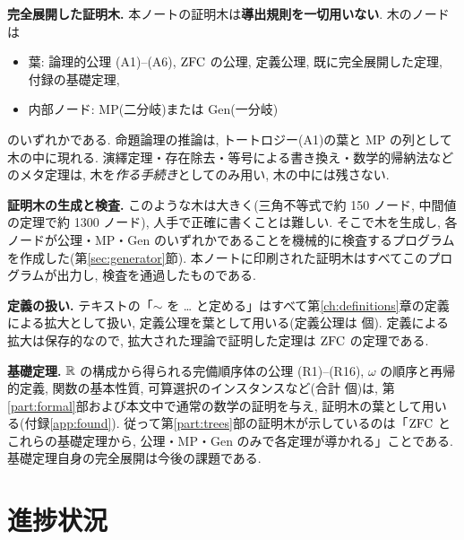 \medskip\noindent\textbf{完全展開した証明木.}\quad
本ノートの証明木は\textbf{導出規則を一切用いない}. 木のノードは
\begin{itemize}
  \item 葉: 論理的公理 (A1)--(A6), $\mathrm{ZFC}$ の公理, 定義公理, 既に完全展開した定理, 付録の基礎定理,
  \item 内部ノード: MP(二分岐)または Gen(一分岐)
\end{itemize}
のいずれかである. 命題論理の推論は, トートロジー(A1)の葉と MP の列として木の中に現れる. 演繹定理・存在除去・等号による書き換え・数学的帰納法などのメタ定理は, 木を\emph{作る手続き}としてのみ用い, 木の中には残さない.

\medskip\noindent\textbf{証明木の生成と検査.}\quad
このような木は大きく(三角不等式で約 150 ノード, 中間値の定理で約 1300 ノード), 人手で正確に書くことは難しい. そこで木を生成し, 各ノードが公理・MP・Gen のいずれかであることを機械的に検査するプログラムを作成した(第\ref{sec:generator}節). 本ノートに印刷された証明木はすべてこのプログラムが出力し, 検査を通過したものである.

\medskip\noindent\textbf{定義の扱い.}\quad
テキストの「$\sim$ を … と定める」はすべて第\ref{ch:definitions}章の定義による拡大として扱い, 定義公理を葉として用いる(定義公理は \DefCount 個). 定義による拡大は保存的なので, 拡大された理論で証明した定理は $\mathrm{ZFC}$ の定理である.

\medskip\noindent\textbf{基礎定理.}\quad
$\mathbb{R}$ の構成から得られる完備順序体の公理 (R1)--(R16), $\omega$ の順序と再帰的定義, 関数の基本性質, 可算選択のインスタンスなど(合計 \FCount 個)は, 第\ref{part:formal}部および本文中で通常の数学の証明を与え, 証明木の葉として用いる(付録\ref{app:found}). 従って第\ref{part:trees}部の証明木が示しているのは「$\mathrm{ZFC}$ とこれらの基礎定理から, 公理・MP・Gen のみで各定理が導かれる」ことである. 基礎定理自身の完全展開は今後の課題である.

\section{進捗状況}

